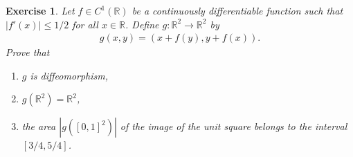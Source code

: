 \documentclass[11pt]{article}
\newtheorem{exercise}{Exercise}[section]
\theoremstyle{definition}
\numberwithin{equation}{subsection}
\begin{document}
\medskip

\begin{exercise}{\rm *}
Let $f \in C^1(\mathbb{R})$ be a continuously differentiable function such that $\left|f'(x)\right| \leq 1/2$ for all $x \in \mathbb{R}$. Define $g: \mathbb{R}^2 \to \mathbb{R}^2$ by
\begin{align*}
    g(x, y) = (x + f(y), y + f(x)).
\end{align*}
Prove that
\begin{enumerate}[label=(\alph*)]
    \item $g$ is diffeomorphism,
    
    \item $g(\mathbb{R}^2) = \mathbb{R}^2$,
    
    \item the area $\left| g([0,1]^2) \right|$ of the image of the unit square belongs to the interval $[3/4, 5/4]$.
\end{enumerate}
\end{exercise}
\end{document}
